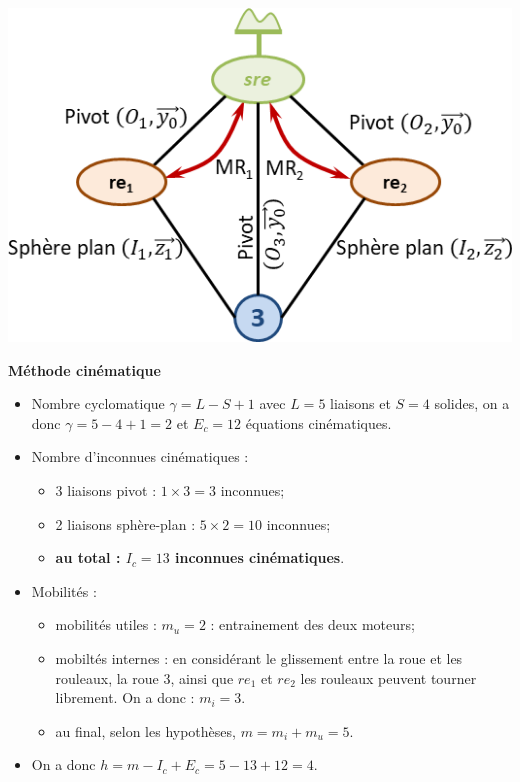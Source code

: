 \documentclass[10pt,fleqn]{article} %
\begin{document}
\begin{center}
\includegraphics[width=.7\linewidth]{images/fig_02}
\end{center}
\begin{multicols}{2}
\textbf{Méthode cinématique}
\begin{itemize}
\item Nombre cyclomatique $\gamma = L-S+1 $ avec $L=5$ liaisons et $S=4$ solides, on a donc $\gamma = 5-4+1=2$ et $E_c=12$ équations cinématiques.
\item Nombre d'inconnues cinématiques : 
\begin{itemize}
\item 3 liaisons pivot : $1\times 3=3$ inconnues;
\item 2 liaisons sphère-plan : $5\times 2=10$ inconnues;
\item \textbf{au total : $I_c=13$ inconnues cinématiques}.
\end{itemize}
\item Mobilités : 
\begin{itemize}
\item mobilités utiles : $m_u=2$ : entrainement des deux moteurs;
\item mobiltés internes : en considérant le glissement entre la roue et les rouleaux, la roue 3, ainsi que $re_1$ et $re_2$ les rouleaux peuvent tourner librement. On a donc : $m_i =3$. %
\item au final, selon les hypothèses, $m=m_i+m_u=5$.
\end{itemize}
\item On a donc $h=m-I_c+E_c =5-13+12=4$.
\end{itemize}

\vfill\null
\columnbreak


\end{multicols}
\end{document}
